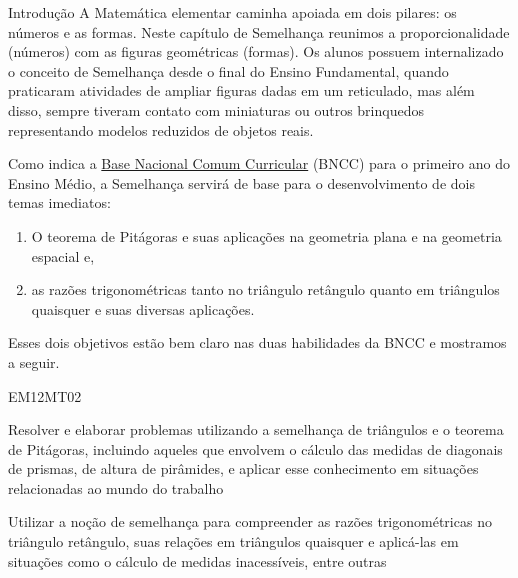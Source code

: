 \begin{apresentacao}{Introdução}
A Matemática elementar caminha apoiada em dois pilares: os números e as formas. Neste capítulo de Semelhança reunimos a proporcionalidade (números) com as figuras geométricas (formas). Os alunos possuem internalizado o conceito de Semelhança desde o final do Ensino Fundamental, quando praticaram atividades de ampliar figuras dadas em um reticulado, mas além disso, sempre tiveram contato com miniaturas ou outros brinquedos representando modelos reduzidos de objetos reais.

Como indica a \href{http://historiadabncc.mec.gov.br/documentos/bncc-2versao.revista.pdf}{Base Nacional Comum Curricular}  (BNCC) para o primeiro ano do Ensino Médio, a Semelhança servirá de base para o desenvolvimento de dois temas imediatos:
\begin{enumerate}
\item {} 
O teorema de Pitágoras e suas aplicações na geometria plana e na geometria espacial e,

\item {} 
as razões trigonométricas tanto no triângulo retângulo quanto em triângulos quaisquer e suas diversas aplicações.

\end{enumerate}

Esses dois objetivos estão bem claro nas duas habilidades da BNCC e mostramos a seguir.

\begin{habilities}{EM12MT02}

Resolver e elaborar problemas utilizando a semelhança de triângulos e o teorema de Pitágoras, incluindo aqueles que envolvem o cálculo das medidas de diagonais de prismas, de altura de pirâmides, e aplicar esse conhecimento em situações relacionadas ao mundo do trabalho


Utilizar a noção de semelhança para compreender as razões trigonométricas no triângulo retângulo, suas relações em triângulos quaisquer e aplicá-las em situações como o cálculo de medidas inacessíveis, entre outras
\end{habilities}


\end{apresentacao}
